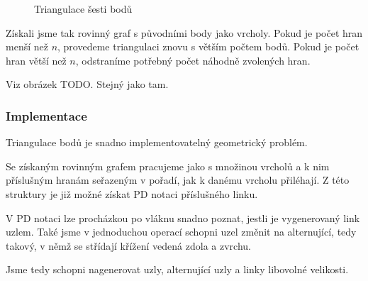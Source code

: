 \begin{figure}[h]  
\centering 
{}
\caption{Triangulace šesti bodů}
\end{figure}  

Získali jsme tak rovinný graf s původními body jako vrcholy. Pokud je počet hran menší než $n$, provedeme triangulaci znovu s větším počtem bodů. Pokud je počet hran větší než $n$, odstraníme potřebný počet náhodně zvolených hran.

Viz obrázek TODO. Stejný jako tam.

\subsubsection{Implementace}

Triangulace bodů je snadno implementovatelný geometrický problém. 


Se získaným rovinným grafem pracujeme jako s množinou vrcholů a k nim příslušným hranám seřazeným v pořadí, jak k danému vrcholu přiléhají. Z této struktury je již možné získat PD notaci příslušného linku.


V PD notaci lze procházkou po vláknu snadno poznat, jestli je vygenerovaný link uzlem. Také jsme v jednoduchou operací schopni uzel změnit na alternující, tedy takový, v němž se střídají křížení vedená zdola a zvrchu.

Jsme tedy schopni nagenerovat uzly, alternující uzly a linky libovolné velikosti.

